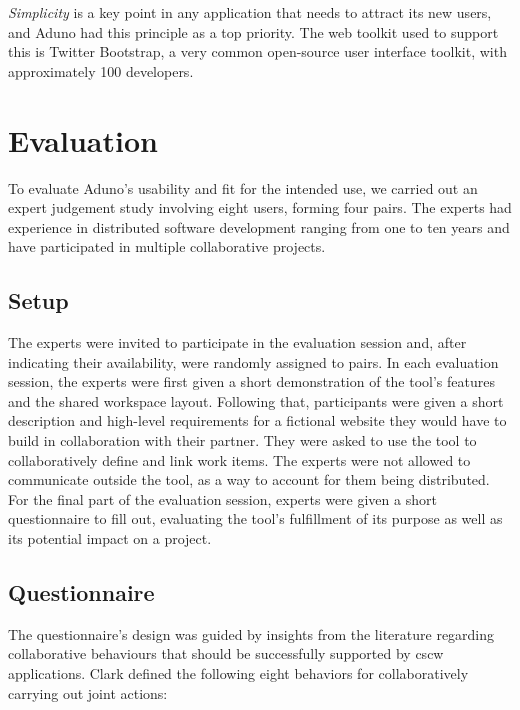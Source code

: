 \documentclass[conference]{IEEEtran}
\begin{document}
\emph{Simplicity} is a key point in any application that needs to attract its new users, and Aduno had this principle as a top priority.  The web toolkit used to support this is Twitter Bootstrap, a very common open-source user interface toolkit, with approximately 100 developers.

\section{Evaluation}
\label{sec:evaluation}

To evaluate Aduno's usability and fit for the intended use, we carried out an expert judgement study involving eight users, forming four pairs. The experts had experience in distributed software development ranging from one to ten years and have participated in multiple collaborative projects.

\subsection{Setup}
The experts were invited to participate in the evaluation session and, after indicating their availability, were randomly assigned to pairs. In each evaluation session, the experts were first given a short demonstration of the tool's features and the shared workspace layout. Following that, participants were given a short description and high-level requirements for a fictional website they would have to build in collaboration with their partner. They were asked to use the tool to collaboratively define and link work items. The experts were not allowed to communicate outside the tool, as a way to account for them being distributed. For the final part of the evaluation session, experts were given a short questionnaire to fill out, evaluating the tool's fulfillment of its purpose as well as its potential impact on a project.

\subsection{Questionnaire}
The questionnaire's design was guided by insights from the literature regarding collaborative behaviours that should be successfully supported by {\sc cscw} applications. Clark \cite{Clark96} defined the following eight behaviors for collaboratively carrying out joint actions:
\end{document}
